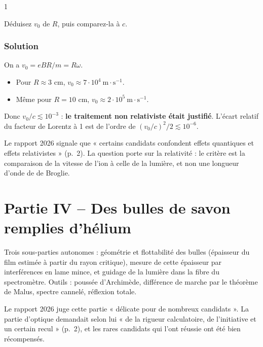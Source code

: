 \documentclass[11pt,a4paper]{article}
\providecommand{\tightlist}{\setlength{\itemsep}{0pt}\setlength{\parskip}{0pt}}
\begin{document}
\begin{indication}{1}

Déduisez \(v_0\) de \(R\), puis comparez-la à \(c\).

\end{indication}

\hypertarget{solution-28}{%
\subsubsection{Solution}\label{solution-28}}

On a \(v_0=eBR/m=R\omega\).

\begin{itemize}
\tightlist
\item
  Pour \(R\approx3\) cm, \(v_0\approx7\cdot10^4\ \mathrm{m\cdot s^{-1}}\).
\item
  Même pour \(R=10\) cm, \(v_0\approx2\cdot10^5\ \mathrm{m\cdot s^{-1}}\).
\end{itemize}

Donc \(v_0/c\lesssim10^{-3}\) : \textbf{le traitement non relativiste était justifié}. L'écart relatif du facteur de Lorentz à 1 est de l'ordre de \((v_0/c)^2/2\lesssim10^{-6}\).

\begin{piege}

Le rapport 2026 signale que « certains candidats confondent effets quantiques et effets relativistes » (p.~2). La question porte sur la relativité : le critère est la comparaison de la vitesse de l'ion à celle de la lumière, et non une longueur d'onde de de Broglie.

\end{piege}

\hypertarget{partie-iv-des-bulles-de-savon-remplies-dhuxe9lium}{%
\section{Partie IV -- Des bulles de savon remplies d'hélium}\label{partie-iv-des-bulles-de-savon-remplies-dhuxe9lium}}

Trois sous-parties autonomes : géométrie et flottabilité des bulles (épaisseur du film estimée à partir du rayon critique), mesure de cette épaisseur par interférences en lame mince, et guidage de la lumière dans la fibre du spectromètre. Outils : poussée d'Archimède, différence de marche par le théorème de Malus, spectre cannelé, réflexion totale.

Le rapport 2026 juge cette partie « délicate pour de nombreux candidats ». La partie d'optique demandait selon lui « de la rigueur calculatoire, de l'initiative et un certain recul » (p.~2), et les rares candidats qui l'ont réussie ont été bien récompensés.
\end{document}
